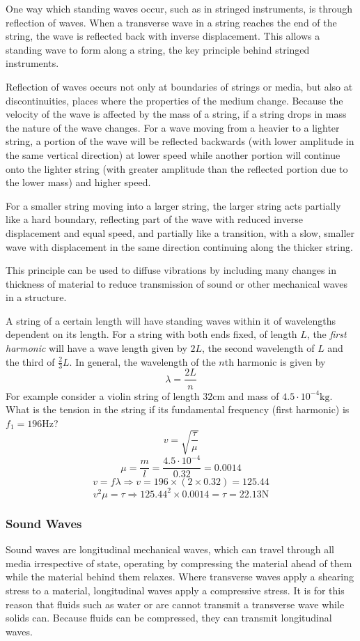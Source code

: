 \documentclass[12pt]{report}
\begin{document}
\begin{flushleft}
\bigskip
One way which standing waves occur, such as in stringed instruments, is through
reflection of waves. When a transverse wave in a string reaches the end of the
string, the wave is reflected back with inverse displacement. This allows a
standing wave to form along a string, the key principle behind stringed 
instruments. 

\bigskip
Reflection of waves occurs not only at boundaries of strings or
media, but also at discontinuities, places where the properties of the medium
change. Because the velocity of the wave is affected by the mass of a string,
if a string drops in mass the nature of the wave changes. For a wave moving 
from a heavier to a lighter string, a portion of the wave will be reflected
backwards (with lower amplitude in the same vertical direction) at lower speed
while another portion will continue onto the lighter string (with greater 
amplitude than the reflected portion due to the lower mass) and higher speed.

\bigskip
For a smaller string moving into a larger string, the larger string acts 
partially like a hard boundary, reflecting part of the wave with reduced
inverse displacement and equal speed, and partially like a transition, with
a slow, smaller wave with displacement in the same direction continuing along
the thicker string.

\bigskip
This principle can be used to diffuse vibrations by including many changes in
thickness of material to reduce transmission of sound or other mechanical waves
in a structure.

\bigskip
A string of a certain length will have standing waves within it of wavelengths
dependent on its length. For a string with both ends fixed, of length \(L\), 
the \textit{first harmonic} will have a wave length given by \(2L\), the second
wavelength of \(L\) and the third of \(\frac{2}{3}L\). In general, the 
wavelength of the \(n\)th harmonic is given by
\[\lambda = \frac{2L}{n}\]
For example consider a violin string of length \(32\mathrm{cm}\) and mass of
\(4.5\cdot10^{-4}\mathrm{kg}\). What is the tension in the string if its 
fundamental frequency (first harmonic) is \(f_1 = 196\mathrm{Hz}\)?
\[v = \sqrt{\frac{\tau}{\mu}}\]
\[\mu = \frac{m}{l} = \frac{4.5\cdot10^{-4}}{0.32} = 0.0014\]
\[v = f\lambda \Rightarrow v = 196 \times (2 \times 0.32) = 125.44\]
\[v^2\mu = \tau \Rightarrow 125.44^2\times0.0014 = \tau = 22.13\mathrm{N}\]

\subsubsection*{Sound Waves}
Sound waves are longitudinal mechanical waves, which can travel through all 
media irrespective of state, operating by compressing the material ahead of 
them while the material behind them relaxes. Where transverse waves apply a
shearing stress to a material, longitudinal waves apply a compressive stress.
It is for this reason that fluids such as water or are cannot transmit a 
transverse wave while solids can. Because fluids can be compressed, they can
transmit longitudinal waves.


\end{flushleft}
\end{document}
